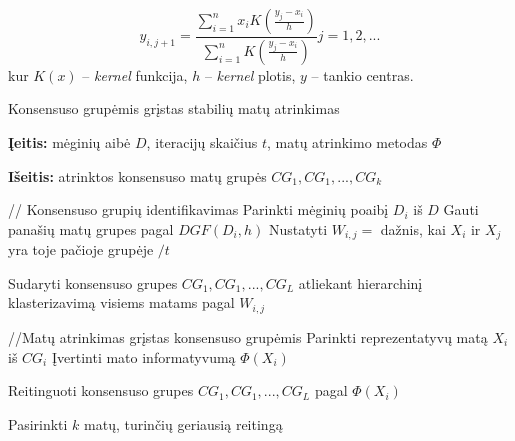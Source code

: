 \begin{equation}
\label{for_dgf}
  y_{i, j+1}=\frac{\sum_{i=1}^{n} x_i K(\frac{y_j - x_i}{h})}{\sum_{i=1}^{n} K(\frac{y_j - x_i}{h})} j=1,2,...
\end{equation}
kur $K(x)$ -- \textit{kernel} funkcija, $h$ -- \textit{kernel} plotis, $y$ -- tankio centras.

\begin{algorithm}
 \caption{Konsensuso grupėmis grįstas stabilių matų atrinkimas}
 \label{CGS}
 \begin{algorithmic}
   \item \textbf{Įeitis:} mėginių aibė $D$, iteracijų skaičius $t$, matų atrinkimo metodas $\Phi$\
   \item \textbf{Išeitis:} atrinktos konsensuso matų grupės $CG_1, CG_1,..., CG_k$
   \item // Konsensuso grupių identifikavimas
    \State Parinkti mėginių  poaibį $D_i$ iš $D$
    \State Gauti panašių matų grupes pagal $DGF(D_i, h)$
   \EndFor
    \State Nustatyti $W_{i,j}=$ dažnis, kai $X_i$ ir $X_j$ yra toje pačioje grupėje $/t$
   \EndFor
   \item Sudaryti konsensuso grupes $CG_1, CG_1,..., CG_L$ atliekant hierarchinį klasterizavimą visiems matams pagal $W_{i, j}$
   \item //Matų atrinkimas grįstas konsensuso grupėmis
    \State Parinkti reprezentatyvų matą $X_i$ iš $CG_i$
    \State Įvertinti mato informatyvumą $\Phi(X_i)$
   \EndFor
   \item Reitinguoti konsensuso grupes $CG_1, CG_1,..., CG_L$ pagal $\Phi(X_i)$
   \item Pasirinkti $k$ matų, turinčių geriausią reitingą  
 \end{algorithmic}
\end{algorithm}